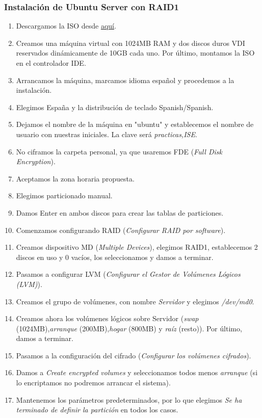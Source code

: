 \documentclass[12pt,spanish]{article}
\begin{document}
\subsubsection{Instalación de Ubuntu Server con RAID1}
\begin{enumerate}
  \item Descargamos la ISO desde \href{http://atcproyectos.ugr.es/esriie/ubuntu-16.04.5-server-amd64.iso}{aquí}.
  \item Creamos una máquina virtual con 1024MB RAM y dos discos duros VDI reservados dinámicamente de 10GB cada uno. Por último, montamos la ISO en el controlador IDE.
  \item  Arrancamos la máquina, marcamos idioma español y procedemos a la instalación.
  \item Elegimos España y la distribución de teclado Spanish/Spanish.
	\item Dejamos el nombre de la máquina en "ubuntu" y establecemos el nombre de usuario con nuestras iniciales. La clave será \textit{practicas,ISE}.
	\item No ciframos la carpeta personal, ya que usaremos FDE (\textit{Full Disk Encryption}).
	\item Aceptamos la zona horaria propuesta.
	\item Elegimos particionado manual.
	\item Damos Enter en ambos discos para crear las tablas de particiones.
	\item Comenzamos configurando RAID (\textit{Configurar RAID por software}).
	\item Creamos dispositivo MD (\textit{Multiple Devices}), elegimos RAID1, establecemos 2 discos en uso y 0 vacíos, los seleccionamos y damos a terminar.
	\item Pasamos a configurar LVM (\textit{Configurar el Gestor de Volúmenes Lógicos (LVM)}).
	\item Creamos el grupo de volúmenes, con nombre \textit{Servidor} y elegimos \textit{/dev/md0}.
	\item Creamos ahora los volúmenes lógicos sobre Servidor (\textit{swap} (1024MB),\textit{arranque} (200MB),\textit{hogar} (800MB) y \textit{raíz} (resto)). Por último, damos a terminar.
	\item Pasamos a la configuración del cifrado (\textit{Configurar los volúmenes cifrados}).
	\item Damos a \textit{Create encrypted volumes} y seleccionamos todos menos \textit{arranque} (si lo encriptamos no podremos arrancar el sistema).
	\item Mantenemos los parámetros predeterminados, por lo que elegimos \textit{Se ha terminado de definir la partición} en todos los casos.

\end{enumerate}
\end{document}
